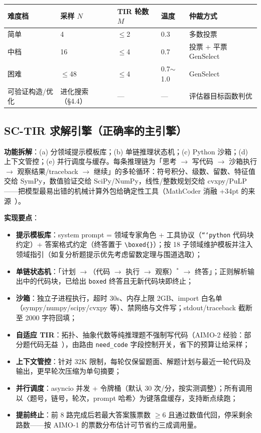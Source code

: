 \documentclass[11pt, a4paper]{ctexart}
\newcommand{\hl}[1]{\textcolor{accentred}{\textbf{#1}}}
\begin{document}
\begin{center}
\small
\begin{tabular}{lllll}
\toprule
\textbf{难度档} & \textbf{采样 $N$} & \textbf{TIR 轮数 $M$} & \textbf{温度} & \textbf{仲裁方式} \\
\midrule
简单 & 4 & $\leq$2 & 0.3 & 多数投票 \\
中档 & 16 & $\leq$4 & 0.7 & 投票 + 平票 GenSelect \\
困难 & $\leq$48 & $\leq$4 & 0.7$\sim$1.0 & GenSelect \\
可验证构造/优化 & 进化搜索（\S4.4） & --- & --- & 评估器目标函数判优 \\
\bottomrule
\end{tabular}
\end{center}

\subsection{SC-TIR 求解引擎（正确率的主引擎）}

\textbf{功能拆解}：(a) 分领域提示模板库；(b) 单链推理状态机；(c) Python 沙箱；(d) 上下文管控；(e) 并行调度与缓存。每条推理链为「思考 $\rightarrow$ 写代码 $\rightarrow$ 沙箱执行 $\rightarrow$ 观察结果/traceback $\rightarrow$ 继续」的多轮循环：符号积分、级数、留数、特征值交给 SymPy，数值验证交给 SciPy/NumPy，线性/整数规划交给 cvxpy/PuLP——把模型最易出错的机械计算外包给确定性工具（MathCoder 消融 +34pt 的来源~\cite{mathcoder}）。

\textbf{实现要点}：

\begin{itemize}[itemsep=0.1em]
  \item \textbf{提示模板库}：system prompt = 领域专家角色 + 工具协议（\texttt{```python} 代码块约定）+ 答案格式约定（终答置于 \texttt{\textbackslash boxed\{\}}）；按 18 子领域维护模板并注入领域指引（如复分析题提示优先考虑留数定理与围道选取）；
  \item \textbf{单链状态机}：「计划 $\to$（代码 $\to$ 执行 $\to$ 观察）$^{*}$ $\to$ 终答」；正则解析输出中的代码块，已给出 \texttt{boxed} 终答且无新代码块即终止；
  \item \textbf{沙箱}：独立子进程执行，超时 30s、内存上限 2GB、import 白名单（sympy/numpy/scipy/cvxpy 等）、禁网络与文件写；stdout/traceback 截断至 2000 字符回填；
  \item \hl{自适应 TIR}：拓扑、抽象代数等纯推理题不强制写代码（AIMO-2 经验：部分题代码无益~\cite{aimo2}），由路由 \texttt{need\_code} 字段控制开关，省下的预算让给采样；
  \item \hl{上下文管控}：针对 32K 限制，每轮仅保留题面、解题计划与最近一轮代码及输出，更早轮次压缩为单句摘要；
  \item \textbf{并行调度}：asyncio 并发 + 令牌桶（默认 30 次/分，按实测调整）；所有调用以〈题号，链号，轮次，prompt 哈希〉为键落盘缓存，支持断点续跑；
  \item \hl{提前终止}：前 8 路完成后若最大答案簇票数 $\geq 6$ 且通过数值代回，停采剩余路数——按 AIMO-1 的票数分布估计可节省约三成调用量。
\end{itemize}
\end{document}
